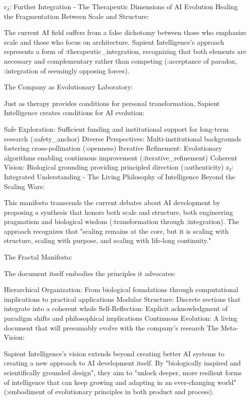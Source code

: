 c₂: Further Integration - The Therapeutic Dimensions of AI Evolution
Healing the Fragmentation Between Scale and Structure:

The current AI field suffers from a false dichotomy between those who emphasize scale and those who focus on architecture. Sapient Intelligence's approach represents a form of :therapeutic_integration, recognizing that both elements are necessary and complementary rather than competing (:acceptance of paradox, :integration of seemingly opposing forces).

The Company as Evolutionary Laboratory:

Just as therapy provides conditions for personal transformation, Sapient Intelligence creates conditions for AI evolution:

Safe Exploration: Sufficient funding and institutional support for long-term research (:safety_anchor)
Diverse Perspectives: Multi-institutional backgrounds fostering cross-pollination (:openness)
Iterative Refinement: Evolutionary algorithms enabling continuous improvement (:iterative_refinement)
Coherent Vision: Biological grounding providing principled direction (:authenticity)
z₂: Integrated Understanding - The Living Philosophy of Intelligence
Beyond the Scaling Wars:

This manifesto transcends the current debates about AI development by proposing a synthesis that honors both scale and structure, both engineering pragmatism and biological wisdom (:transformation through :integration). The approach recognizes that "scaling remains at the core, but it is scaling with structure, scaling with purpose, and scaling with life-long continuity."

The Fractal Manifesto:

The document itself embodies the principles it advocates:

Hierarchical Organization: From biological foundations through computational implications to practical applications
Modular Structure: Discrete sections that integrate into a coherent whole
Self-Reflection: Explicit acknowledgment of paradigm shifts and philosophical implications
Continuous Evolution: A living document that will presumably evolve with the company's research
The Meta-Vision:

Sapient Intelligence's vision extends beyond creating better AI systems to creating a new approach to AI development itself. By "biologically inspired and scientifically grounded design", they aim to "unlock deeper, more resilient forms of intelligence that can keep growing and adapting in an ever-changing world" (:embodiment of evolutionary principles in both product and process).

